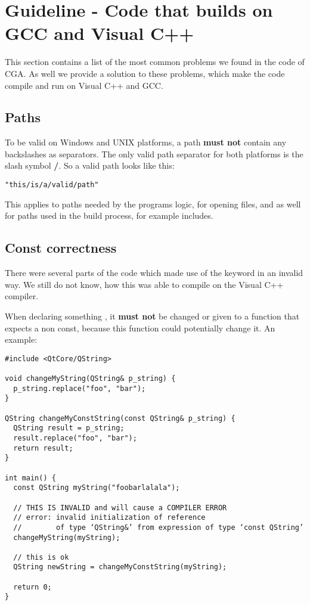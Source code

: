 
\section{Guideline - Code that builds on GCC and Visual C++}

This section contains a list of the most common problems we found in the code of CGA. As well we provide a solution to these problems, which make the code compile and run on Visual C++ and GCC.

\subsection{Paths}

To be valid on Windows and UNIX platforms, a path \textbf{must not} contain any backslashes as separators. The only valid path separator for both platforms is the slash symbol \textbf{/}. So a valid path looks like this: 

\begin{verbatim}
"this/is/a/valid/path" 
\end{verbatim}

This applies to paths needed by the programs logic, for opening files, and as well for paths used in the build process, for example includes.

\subsection{Const correctness} There were several parts of the code which made use of the keyword  in an invalid way. We still do not know, how this was able to compile on the Visual C++ compiler.

When declaring something , it \textbf{must not} be changed or given to a function that expects a non const, because this function could potentially change it. An example:

\begin{verbatim}
#include <QtCore/QString>

void changeMyString(QString& p_string) {
  p_string.replace("foo", "bar");
}

QString changeMyConstString(const QString& p_string) {
  QString result = p_string;
  result.replace("foo", "bar");
  return result;
}

int main() {
  const QString myString("foobarlalala");

  // THIS IS INVALID and will cause a COMPILER ERROR
  // error: invalid initialization of reference 
  //        of type ‘QString&’ from expression of type ‘const QString’
  changeMyString(myString);

  // this is ok
  QString newString = changeMyConstString(myString);

  return 0;
}
\end{verbatim}


